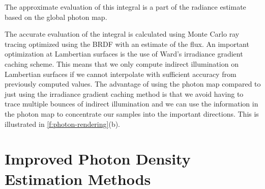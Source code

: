 The approximate evaluation of this integral is a part of the radiance estimate based on the global photon map.

The accurate evaluation of the integral is calculated using Monte Carlo ray tracing optimized using the BRDF with an estimate of the flux. An important optimization at Lambertian surfaces is the use of Ward's irradiance gradient caching scheme. This means that we only compute indirect illumination on Lambertian surfaces if we cannot interpolate with sufficient accuracy from previously computed values. The advantage of using the photon map compared to just using the irradiance gradient caching method is that we avoid having to trace multiple bounces of indirect illumination and we can use the information in the photon map to concentrate our samples into the important directions. This is illustrated in \ref{f:photon-rendering}(b).





\section{Improved Photon Density Estimation Methods}

